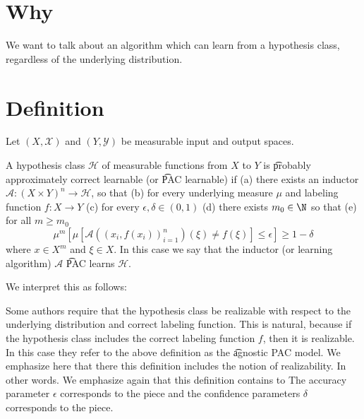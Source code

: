 

\section*{Why}

We want to talk about an algorithm which can learn from a hypothesis class, regardless of the underlying distribution.

  \section*{Definition}

Let $(X, \mathcal{X} )$ and $(Y, \mathcal{Y} )$ be measurable input and output spaces.

A hypothesis class $\mathcal{H} $ of measurable functions from $X$ to $Y$ is \t{probably approximately correct learnable} (or \t{PAC learnable}) if
(a) there exists an inductor $\mathcal{A} : (X \times  Y)^n \to \mathcal{H} $, so that (b) for every underlying measure $\mu $ and labeling function $f: X \to Y$ (c) for every $\epsilon , \delta  \in (0, 1)$ (d) there exists $m_0 \in \N  $ so that (e) for all $m \geq m_0$
    \[
\mu ^m\left[
\mu \left[
\mathcal{A} ((x_i, f(x_i))_{i = 1}^{n})(\xi ) \neq f(\xi )
\right]
\leq \epsilon  \right] \geq 1-\delta
    \]
where $x \in X^m$ and $\xi  \in X$.
In this case we say that the inductor (or learning algorithm) $\mathcal{A} $ \t{PAC learns} $\mathcal{H} $.

We interpret this as follows: 

Some authors require that the hypothesis class be realizable with respect to the underlying distribution and correct labeling function.
This is natural, because if the hypothesis class includes the correct labeling function $f$, then it is realizable.
In this case they refer to the above definition as the \t{agnostic PAC model}.
We emphasize here that there this definition includes the notion of realizability.
In other words.
We emphasize again that this definition contains to 
The accuracy parameter $\epsilon $ corresponds to the  piece and the confidence parameters $\delta $ corresponds to the  piece.

